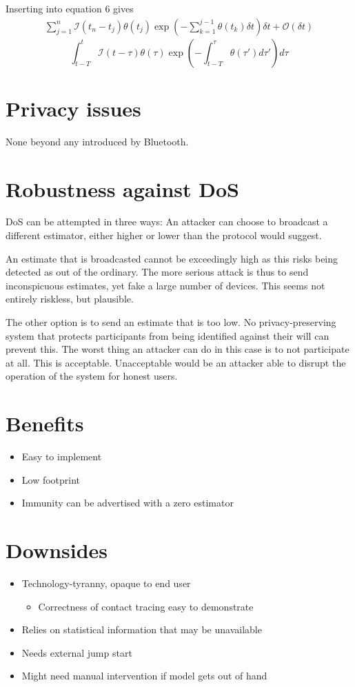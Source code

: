 \documentclass{article}
\begin{document}
Inserting into equation \(6\) gives
\begin{align*}
  \sum_{j=1}^n \mathcal{I}\left( t_n-t_j \right) \theta\left( t_j \right)
  \exp \left( -\sum_{k=1}^{j-1} \theta\left( t_k \right)\delta t
  \right)\delta t+  \mathcal{O}\left( \delta t\right)
\end{align*}
\[
  \int_{t-T}^t \mathcal{I}(t-\tau)\theta(\tau)\exp \left( -\int_{t-T}^\tau \theta\left( \tau' \right)d\tau'\right)d\tau
\]
\section{Privacy issues}

None beyond any introduced by Bluetooth.

\section{Robustness against DoS}

DoS can be attempted in three ways:
An attacker can choose to broadcast a different estimator, either higher or lower than the protocol
would suggest.

An estimate that is broadcasted cannot be exceedingly high as this risks being
detected as out of the ordinary.
The more serious attack is thus to send inconspicuous estimates, yet
fake a large number of devices. This seems not entirely riskless, but plausible.

The other option is to send an estimate that is too low. No privacy-preserving
system that protects participants from being identified against their will can
prevent this. The worst thing an attacker can do in this case is
to not participate at all. This is acceptable. Unacceptable would be an attacker
able to disrupt the operation of the system for honest users.

\section{Benefits}
\begin{itemize}
\item Easy to implement
\item Low footprint
\item Immunity can be advertised with a zero estimator
\end{itemize}

\section{Downsides}
\begin{itemize}
\item Technology-tyranny, opaque to end user
  \begin{itemize}
  \item Correctness of contact tracing easy to demonstrate
  \end{itemize}
\item Relies on statistical information that may be unavailable
\item Needs external jump start
\item Might need manual intervention if model gets out of hand
\end{itemize}
\end{document}
